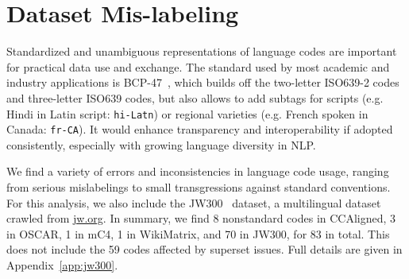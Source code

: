 \section{Dataset Mis-labeling}
\label{sec:codes}
Standardized and unambiguous representations of language codes are important for practical data use and exchange. The standard used by most academic and industry applications is BCP-47~\citep{phillips-etal-2005-tags}, which builds off the two-letter ISO639-2 codes and three-letter ISO639 codes, but also allows to add subtags for scripts (e.g. Hindi in Latin script: \texttt{hi-Latn}) or regional varieties (e.g. French spoken in Canada: \texttt{fr-CA}). It would enhance transparency and interoperability if adopted consistently, especially with growing language diversity in NLP. %

We find a variety of errors and inconsistencies in language code usage, ranging from serious mislabelings to small transgressions against standard conventions. For this analysis, we also include the JW300~\citep{agic-vulic-2019-jw300} dataset, a multilingual dataset crawled from \url{jw.org}. %
In summary, we find 8 nonstandard codes in CCAligned, 3 in OSCAR, 1 in mC4, 1 in WikiMatrix, and 70 in JW300, for 83 in total. This does not include the 59 codes affected by superset issues. %
Full details are given in Appendix~\ref{app:jw300}.

